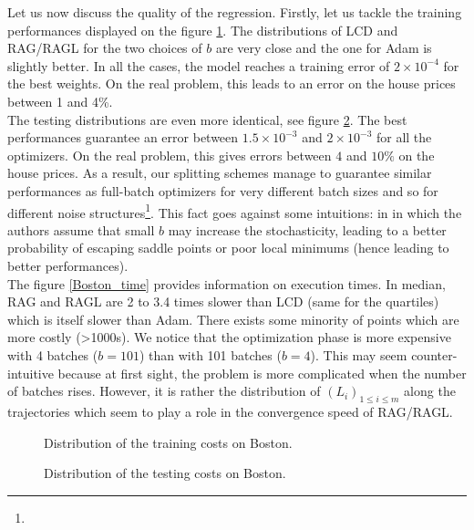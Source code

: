 Let us now discuss the quality of the regression. Firstly, let us tackle the training performances displayed on the figure \ref{Boston_train}. The distributions of LCD and RAG/RAGL for the two choices of $b$ are very close and the one for Adam is slightly better. In all the cases, the model reaches a training error of $2 \times 10^{-4}$ for the best weights. On the real problem, this leads to an error on the house prices between 1 and 4\%. \\
The testing distributions are even more identical, see figure \ref{Boston_test}. The best performances guarantee an error between $1.5 \times 10^{-3}$ and $2 \times 10^{-3}$ for
all the optimizers. On the real problem, this gives errors between $4$ and $10\%$ on the house prices. As a result, our splitting schemes manage to guarantee similar performances
as full-batch optimizers for very different batch sizes and so for different noise structures\footnote{}. This fact goes against some 
intuitions: in
\cite{sgd_escape1,sgd_escape2} in which the authors assume that small $b$ may increase the stochasticity, leading to a better probability of escaping saddle points or poor local
minimums  (hence leading to better performances).\\
The figure \ref{Boston_time} provides information on execution times. In median, RAG and RAGL are 2 to 3.4 times slower than LCD (same for the quartiles) which is itself slower
than Adam. There exists some minority of points which are more costly (>1000s). We notice that the optimization phase is more expensive with 4 batches ($b=101$) than with 101
batches ($b=4$). This may seem counter-intuitive because at first sight, the problem is more complicated when the number of batches rises. However, it is rather the distribution of
$(L_i)_{1\leq i \leq m}$ along the trajectories which seem to play a role in the convergence speed of RAG/RAGL.    

\begin{figure}[h!]
	\centering
	\scalebox{0.7}{}
	\caption{Distribution of the training costs on Boston.}
	\label{Boston_train}
\end{figure}

\begin{figure}[h!]
	\centering
	\scalebox{0.7}{}
	\caption{Distribution of the testing costs on Boston.}
	\label{Boston_test}
\end{figure}

